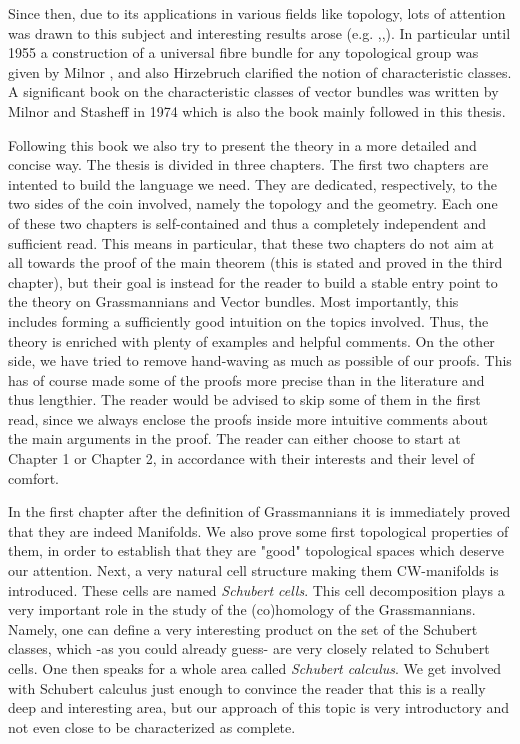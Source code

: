 Since then, due to its applications in various fields like topology, lots of attention was drawn to this subject and interesting results arose (e.g. \cite{thom1952espaces},\cite{borel1955topology},\cite{hirzebruch1956}).
In particular until 1955 a construction of a universal fibre bundle for any topological group was given by Milnor \cite{milnor1956construction}\cite{milnor1956construction2}, and also Hirzebruch clarified the notion of characteristic classes.
A significant book on the characteristic classes of vector bundles was written by Milnor and Stasheff in 1974 \cite{char_class} which is also the book mainly followed in this thesis.

 Following this book we also try to present the theory in a more detailed and concise way. The thesis is divided in three chapters.
The first two chapters are intented to build the language we need. They are dedicated, respectively, to the two sides of the coin involved, namely the topology and the geometry. Each one of these two chapters is self-contained and thus a completely independent and sufficient read. This means in particular, that these two chapters do not aim at all towards the proof of the main theorem (this is stated and proved in the third chapter), but their goal is instead for the reader to build a stable entry point to the theory on Grassmannians and Vector bundles. Most importantly, this includes forming a sufficiently good intuition on the topics involved. Thus, the theory is enriched with plenty of examples and helpful comments. On the other side, we have tried to remove hand-waving as much as possible of our proofs. This has of course made some of the proofs more precise than in the literature and thus lengthier. The reader would be advised to skip some of them in the first read, since we always enclose the proofs inside more intuitive comments about the main arguments in the proof.
The reader can either choose to start at Chapter 1 or Chapter 2, in accordance with their interests and their level of comfort.

In the first chapter after the definition of Grassmannians it is immediately proved that they are indeed Manifolds. We also prove some first topological properties of them, in order to establish that they are "good" topological spaces which deserve our attention. Next, a very natural cell structure making them CW-manifolds is introduced. These cells are named \emph{Schubert cells}. This cell decomposition plays a very important role in the study of the (co)homology of the Grassmannians. Namely, one can define a very interesting product on the set of the Schubert classes, which -as you could already guess- are very closely related to Schubert cells. One then speaks for a whole area called \emph{Schubert calculus}. We get involved with Schubert calculus just enough to convince the reader that this is a really deep and interesting area, but our approach of this topic is very introductory and not even close to be characterized as complete.

